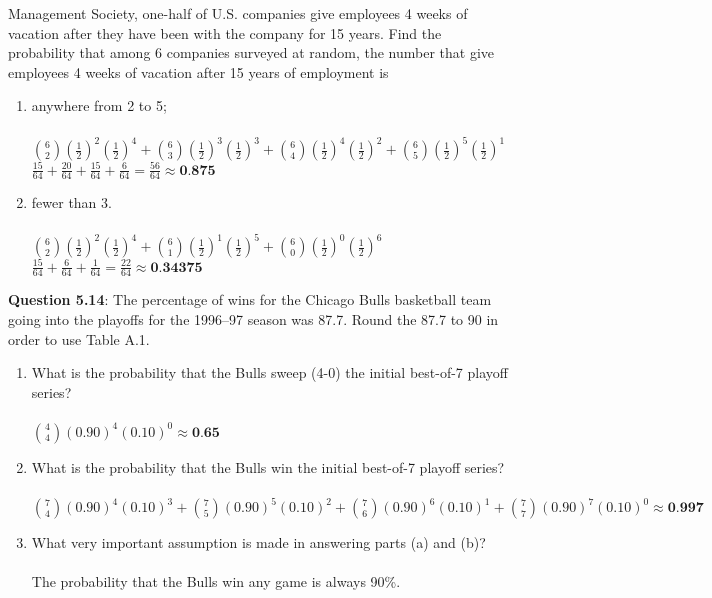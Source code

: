 \documentclass{article}
\begin{document}
    Management Society, one-half of U.S. companies give
    employees 4 weeks of vacation after they have been
    with the company for 15 years. Find the probability 
    that among 6 companies surveyed at random, the
    number that give employees 4 weeks of vacation after
    15 years of employment is
        \begin{enumerate}[label = (\alph*) ]
            \item anywhere from 2 to 5;\\\\
                \indent $\binom{6}{2}(\frac{1}{2})^{2}(\frac{1}{2})^{4} + \binom{6}{3}(\frac{1}{2})^{3}(\frac{1}{2})^{3} + \binom{6}{4}(\frac{1}{2})^{4}(\frac{1}{2})^{2} + \binom{6}{5}(\frac{1}{2})^{5}(\frac{1}{2})^{1}$\\
                \indent $\frac{15}{64} + \frac{20}{64} + \frac{15}{64} + \frac{6}{64} = \frac{56}{64} \approx \textbf{0.875}$
            \item fewer than 3.\\\\
                \indent $\binom{6}{2}(\frac{1}{2})^{2}(\frac{1}{2})^{4} + \binom{6}{1}(\frac{1}{2})^{1}(\frac{1}{2})^{5} + \binom{6}{0}(\frac{1}{2})^{0}(\frac{1}{2})^{6}$\\
                \indent $\frac{15}{64} + \frac{6}{64} + \frac{1}{64} = \frac{22}{64} \approx \textbf{0.34375}$
        \end{enumerate}
    \textbf{Question 5.14}: The percentage of wins for the Chicago Bulls
    basketball team going into the playoffs for the 1996–97
    season was 87.7. Round the 87.7 to 90 in order to use
    Table A.1.
        \begin{enumerate}[label = (\alph*) ]
            \item What is the probability that the Bulls sweep (4-0)
            the initial best-of-7 playoff series?\\\\
                \indent $\binom{4}{4}(0.90)^{4}(0.10)^{0} \approx \textbf{0.65}$
            \item What is the probability that the Bulls win the initial 
            best-of-7 playoff series?\\\\
                \indent $\binom{7}{4}(0.90)^{4}(0.10)^{3} + \binom{7}{5}(0.90)^{5}(0.10)^{2} + \binom{7}{6}(0.90)^{6}(0.10)^{1} + \binom{7}{7}(0.90)^{7}(0.10)^{0} \approx \textbf{0.997}$
            \item What very important assumption is made in answering 
            parts (a) and (b)?\\\\
                \indent The probability that the Bulls win any game is always 90\%.
        \end{enumerate}
\end{document}
